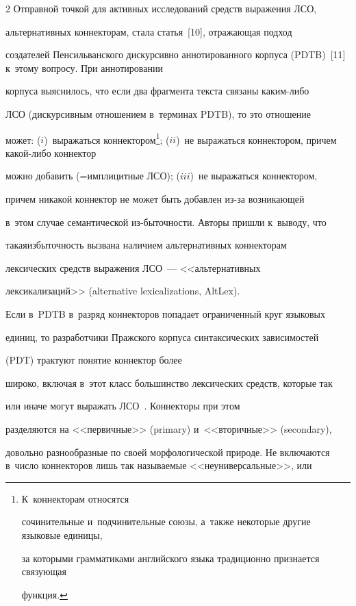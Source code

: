 \begin{multicols}{2}
Отправной точкой для активных исследований средств выражения ЛСО, 


альтернативных коннекторам, стала статья~[10], отражающая подход 


создателей Пенсильванского дискурсивно аннотированного корпуса (PDTB)~[11] к~этому вопросу. При аннотировании 


корпуса выяснилось, что если два фрагмента текста связаны ка\-ки\-м-ли\-бо 


ЛСО (дискурсивным отношением в~терминах PDTB), то это отношение 


может: ($i$)~выражаться коннектором\footnote{К~коннекторам относятся 


сочинительные и~подчинительные союзы, а~также некоторые другие языковые единицы, 


за которыми грамматиками английского языка традиционно признается связующая 


функция.}; ($ii$)~не выражаться коннектором, причем какой-либо коннектор 


можно добавить (=\;импли\-цит\-ные ЛСО); ($iii$)~не выражаться коннектором, 


причем никакой коннектор не может быть добавлен из-за возникающей 


в~этом случае семантической из-\linebreak быточности. Авторы пришли к~выводу, что 


такая\linebreak избыточность вызвана наличием альтернативных коннекторам 


лексических средств выражения ЛСО~--- <<альтернативных 


лексикализаций>> (alternative lexicalizations, AltLex).





Если в~PDTB в~разряд коннекторов попадает ограниченный круг языковых 


единиц, то разработчики Пражского корпуса синтаксических зависимостей 


 (PDT) трактуют понятие коннектор более 


широко, включая в~этот класс большинство лексических средств, которые так 


или иначе могут выражать ЛСО~\cite{3-in, 12-in}. Коннекторы при этом 


разделяются на <<первичные>> (primary) и~<<вторичные>> (secondary), 


довольно разнообразные по своей морфологической природе. Не включаются в~чис\-ло коннекторов лишь так называемые <<неуниверсальные>>, или 



\end{multicols}
